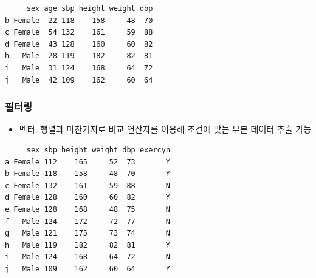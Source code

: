 \documentclass[
  11pt,
]{krantz}
\newenvironment{Shaded}{\begin{snugshade}}{\end{snugshade}}
\newcommand{\CommentTok}[1]{\textcolor[rgb]{0.37,0.37,0.37}{\textit{#1}}}
\newcommand{\DecValTok}[1]{\textcolor[rgb]{0.06,0.06,0.06}{#1}}
\newcommand{\KeywordTok}[1]{\textcolor[rgb]{0.27,0.27,0.27}{\textbf{#1}}}
\newcommand{\NormalTok}[1]{#1}
\newcommand{\OperatorTok}[1]{\textcolor[rgb]{0.43,0.43,0.43}{\textbf{#1}}}
\newcommand{\StringTok}[1]{\textcolor[rgb]{0.5,0.5,0.5}{#1}}
\providecommand{\tightlist}{%
  \setlength{\itemsep}{0pt}\setlength{\parskip}{0pt}}
\begin{document}
\begin{verbatim}
     sex age sbp height weight dbp
b Female  22 118    158     48  70
c Female  54 132    161     59  88
d Female  43 128    160     60  82
h   Male  28 119    182     82  81
i   Male  31 124    168     64  72
j   Male  42 109    162     60  64
\end{verbatim}

\normalsize

\hypertarget{data-frame-filtering}{%
\subsubsection*{필터링}\label{data-frame-filtering}}


\begin{itemize}
\tightlist
\item
  벡터, 행렬과 마찬가지로 비교 연산자를 이용해 조건에 맞는 부분 데이터 추출 가능
\end{itemize}

\footnotesize

\begin{Shaded}
\end{Shaded}

\begin{verbatim}
     sex sbp height weight dbp exercyn
a Female 112    165     52  73       Y
b Female 118    158     48  70       Y
c Female 132    161     59  88       N
d Female 128    160     60  82       Y
e Female 128    168     48  75       N
f   Male 124    172     72  77       N
g   Male 121    175     73  74       N
h   Male 119    182     82  81       Y
i   Male 124    168     64  72       N
j   Male 109    162     60  64       Y
\end{verbatim}

\begin{Shaded}
\end{Shaded}
\end{document}
